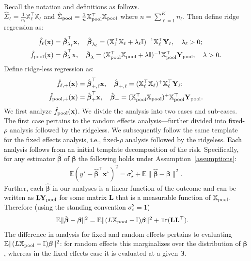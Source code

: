 \documentclass{article}
\theoremstyle{plain}
\theoremstyle{remark}
\def \bbeta{\boldsymbol{\beta}}
\def \bx{\mathbf{x}}
\def \bbeta{\boldsymbol{\beta}}
\def \tr {\mathrm{Tr}}
\def \I{\mathcal{I}}
\def \E{\mathbb{E}}
\def \I {\mathbb{I}}
\begin{document}
Recall the notation and definitions as follows.\\
$\hat{\Sigma}_{\ell}=\frac{1}{n_\ell}\mathbb{X}_{\ell}^\top\mathbb{X}_{\ell}$ and $\hat{\Sigma}_{\rm pool}= \frac{1}{n}\mathbb{X}_{\rm pool}^\top \mathbb{X}_{\rm pool}$ where $n=\sum\limits_{\ell=1}^Kn_{\ell}$. Then define ridge regression as:
\begin{align*}
    \hat{f}_{\ell}(\bx)&=\hat{\boldsymbol{\beta}}_{\lambda_{\ell}}^{\top}\bx,\quad \hat{\boldsymbol{\beta}}_{\lambda_{\ell}}=(\mathbb{X}_{\ell}^\top\mathbb{X}_{\ell}+\lambda_{\ell}\mathbb{I})^{-1}\mathbb{X}_{\ell}^{\top}\mathbf{Y}_{\ell},\quad \lambda_{\ell}>0;\\
    \hat{f}_{\rm pool}(\bx)&=\hat{\boldsymbol{\beta}}_{\lambda}^{\top}\bx,\quad \hat{\boldsymbol{\beta}}_{\lambda}=(\mathbb{X}_{\rm pool}^\top\mathbb{X}_{\rm pool}+\lambda\mathbb{I})^{-1}\mathbb{X}_{\rm pool}^{\top}\mathbf{Y}_{\rm pool},\quad \lambda>0.
\end{align*}
Define ridge-less regression as:
\begin{align*}
    \hat{f}_{\ell,+}(\bx)&=\hat{\boldsymbol{\beta}}_{+,\ell}^{\top}\bx,\quad \hat{\boldsymbol{\beta}}_{+,\ell}=(\mathbb{X}_{\ell}^\top\mathbb{X}_{\ell})^{+}\mathbb{X}_{\ell}^{\top}\mathbf{Y}_{\ell};\\
    \hat{f}_{\rm pool, +}(\bx)&=\hat{\boldsymbol{\beta}}_{+}^{\top}\bx,\quad \hat{\boldsymbol{\beta}}_{+}=(\mathbb{X}_{\rm pool}^\top\mathbb{X}_{\rm pool})^{+}\mathbb{X}_{\rm pool}^{\top}\mathbf{Y}_{\rm pool}.
\end{align*}
We first analyze $ \hat{f}_{\rm pool}(\bx)$. We divide the analysis \textcolor{black}{into} two cases and sub-cases. The first case pertains to the random effects analysis\textcolor{black}{---}further divided into \textcolor{black}{fixed-$\rho$} analysis followed by the ridgeless. We subsequently follow the same template for the fixed effects analysis\textcolor{black}{, i.e.,} fixed-$\rho$ analysis followed by the ridgeless. \textcolor{black}{Each analysis} follows from an initial template decomposition of the risk. Specifically, for any estimator $\hat{\bbeta}$ of $\bbeta$ the following holds under Assumption~\ref{assumptions}:
\begin{align*}
    \E(y^\star-\hat{\bbeta}^\top\bx^\star)^2=\sigma_{\star}^2+\E\|\hat{\bbeta}-\bbeta\|^2.
\end{align*}
Further, each $\hat{\bbeta}$ in our analyses is a linear function of the outcome and can be written as $\mathbf{L}\mathbf{Y}_{\rm pool}$ for some matrix $\mathbf{L}$ that is a measurable function of $\mathbb{X}_{\rm pool}$. Therefore \textcolor{black}{(using the standing convention $\sigma_\varepsilon^2=1$)}
\begin{align*}
\E\|\hat{\bbeta}-\bbeta\|^2&=\E\|(L\mathbb{X}_{\rm pool}-\I)\bbeta\|^2+\tr(\mathbf{L}\mathbf{L}^\top).
    \end{align*}
The difference in analysis for fixed and random effects pertains to evaluating $\E\|(L\mathbb{X}_{\rm pool}-\I)\bbeta\|^2$: for random effects this marginalizes over the distribution of $\bbeta$, whereas in the fixed effects case it is evaluated at a given $\bbeta$.
\end{document}
